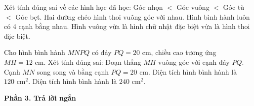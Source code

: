 \begin{ex} %
Xét tính đúng sai về các hình học đã học:
\choiceTF
{\True Góc nhọn $<$ Góc vuông $<$ Góc tù $<$ Góc bẹt.}
{\True Hai đường chéo hình thoi vuông góc với nhau.}
{Hình bình hành luôn có 4 cạnh bằng nhau.}
{\True Hình vuông vừa là hình chữ nhật đặc biệt vừa là hình thoi đặc biệt.}
\end{ex}

\begin{ex} %
Cho hình bình hành $MNPQ$ có đáy $PQ = 20\text{ cm}$, chiều cao tương ứng $MH = 12\text{ cm}$. Xét tính đúng sai:
\choiceTF
{\True Đoạn thẳng $MH$ vuông góc với cạnh đáy $PQ$.}
{\True Cạnh $MN$ song song và bằng cạnh $PQ = 20\text{ cm}$.}
{Diện tích hình bình hành là $120\text{ cm}^2$.}
{\True Diện tích hình bình hành là $240\text{ cm}^2$.}
\end{ex}

\textbf{Phần 3. Trả lời ngắn}

